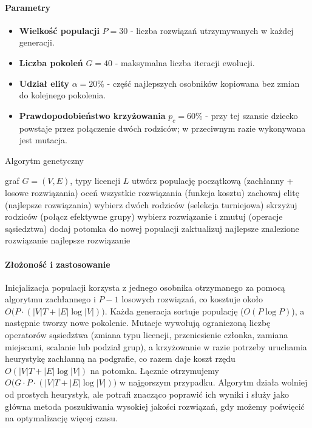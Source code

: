 \paragraph{Parametry}
\begin{itemize}
  \item \textbf{Wielkość populacji} $P=30$ - liczba rozwiązań utrzymywanych w każdej generacji.
  \item \textbf{Liczba pokoleń} $G=40$ - maksymalna liczba iteracji ewolucji.
  \item \textbf{Udział elity} $\alpha=20\%$ - część najlepszych osobników kopiowana bez zmian do kolejnego pokolenia.
  \item \textbf{Prawdopodobieństwo krzyżowania} $p_c=60\%$ - przy tej szansie dziecko powstaje przez połączenie dwóch rodziców; w przeciwnym razie wykonywana jest mutacja.
\end{itemize}

\begin{algorithm}[H]
  \caption{Algorytm genetyczny}
  \label{alg:ga}
  \begin{algorithmic}[1]
    \Require graf $G=(V,E)$, typy licencji $ L$
    \State utwórz populację początkową (zachłanny + losowe rozwiązania)
    \State oceń wszystkie rozwiązania (funkcja kosztu)
    \State zachowaj elitę (najlepsze rozwiązania)
    \State wybierz dwóch rodziców (selekcja turniejowa)
    \State skrzyżuj rodziców (połącz efektywne grupy)
    \Else
    \State wybierz rozwiązanie i zmutuj (operacje sąsiedztwa)
    \EndIf
    \State dodaj potomka do nowej populacji
    \EndWhile
    \State zaktualizuj najlepsze znalezione rozwiązanie
    \EndFor
    \State \Return najlepsze rozwiązanie
  \end{algorithmic}
\end{algorithm}

\paragraph{Złożoność i zastosowanie}
Inicjalizacja populacji korzysta z jednego osobnika otrzymanego za pomocą algorytmu zachłannego i $P-1$ losowych rozwiązań, co kosztuje około $O\bigl(P \cdot (|V|T + |E|\log |V|)\bigr)$. Każda generacja sortuje populację ($O(P\log P)$), a następnie tworzy nowe pokolenie. Mutacje wywołują ograniczoną liczbę operatorów sąsiedztwa (zmiana typu licencji, przeniesienie członka, zamiana miejscami, scalanie lub podział grup), a krzyżowanie w razie potrzeby uruchamia heurystykę zachłanną na podgrafie, co razem daje koszt rzędu $O(|V|T + |E|\log |V|)$ na potomka. Łącznie otrzymujemy $O\bigl(G \cdot P \cdot (|V|T + |E|\log |V|)\bigr)$ w najgorszym przypadku. Algorytm działa wolniej od prostych heurystyk, ale potrafi znacząco poprawić ich wyniki i służy jako główna metoda poszukiwania wysokiej jakości rozwiązań, gdy możemy poświęcić na optymalizację więcej czasu.


